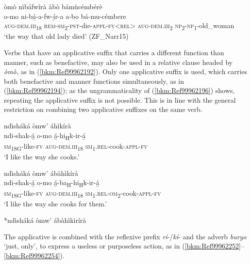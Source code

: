 \ea
\label{bkm:Ref99962160}
òmò nìbáfwîrà àbò bámùcémbérè\\
\gll o-mo    ni-bá̲-a-fw-í̲r-a a-bo    bá-mu-cémbere \\
\textsc{aug}-\textsc{dem}.\textsc{iii}\textsubscript{18}  \textsc{rem}-\textsc{sm}\textsubscript{2}-\textsc{pst}-die-\textsc{appl}-\textsc{fv}<\textsc{rel}>
\textsc{aug}-\textsc{dem}.\textsc{iii}\textsubscript{2}  \textsc{np}\textsubscript{2}-\textsc{np}\textsubscript{1}-old\_woman\\
\glt ‘the way that old lady died’ (ZF\_Narr15)
\z

Verbs that have an applicative suffix that carries a different function than manner, such as benefactive, may also be used in a relative clause headed by \textit{òmò,} as in (\ref{bkm:Ref99962192}). Only one applicative suffix is used, which carries both benefactive and manner functions simultaneously, as in (\ref{bkm:Ref99962194}); as the ungrammaticality of (\ref{bkm:Ref99962196}) shows, repeating the applicative suffix is not possible. This is in line with the general restriction on combining two applicative suffixes on the same verb.

\ea
\label{bkm:Ref99962192}
ndìsháká òmw’ áhìkírà\\
\gll ndi-shak-á̲    o-mo      á̲-hi\textsubscript{H}k-ir-á̲\\
\textsc{sm}\textsubscript{1SG}-like-\textsc{fv}  \textsc{aug}-\textsc{dem}.\textsc{iii}\textsubscript{18}  \textsc{sm}\textsubscript{1}.\textsc{rel}-cook-\textsc{appl}-\textsc{fv}\\
\glt ‘I like the way she cooks.’
\z

\ea
\label{bkm:Ref99962194}
ndìsháká òmw’ ábàhìkírà\\
\gll ndi-shak-á̲    o-mo      á̲-ba\textsubscript{H}-hi\textsubscript{H}k-ir-á̲\\
\textsc{sm}\textsubscript{1SG}-like-\textsc{fv}  \textsc{aug}-\textsc{dem}.\textsc{iii}\textsubscript{18}  \textsc{sm}\textsubscript{1}.\textsc{rel}-\textsc{om}\textsubscript{2}-cook-\textsc{appl}-\textsc{fv}\\
\glt ‘I like the way she cooks for them.’
\z

\ea
\label{bkm:Ref99962196}
  *ndìsháká òmw’ ábàhìkìrírà
\z

The applicative is combined with the reflexive prefix \textit{rí}-/\textit{kí}- and the adverb \textit{buryo} ‘just, only’, to express a useless or purposeless action, as in (\ref{bkm:Ref99962252}--\ref{bkm:Ref99962254}).

